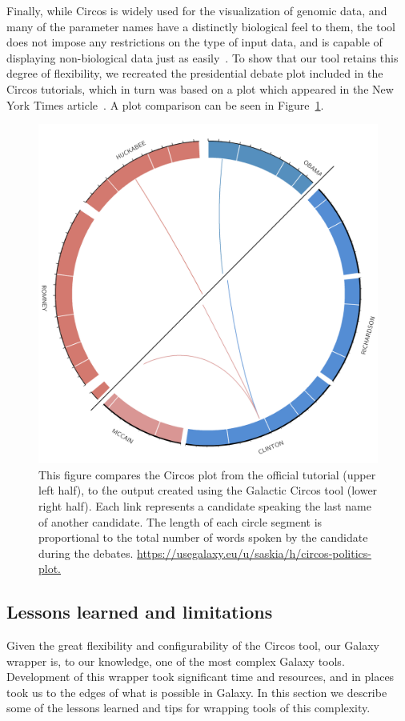 Finally, while Circos is widely used for the visualization of genomic data, and many of the parameter names have a distinctly biological feel to them, the tool does not impose any restrictions on the type of input data, and is capable of displaying non-biological data just as easily~\cite{circosnongenomic}. To show that our tool retains this degree of flexibility, we recreated the presidential debate plot included in the Circos tutorials, which in turn was based on a plot which appeared in the New York Times article~\cite{namingnames}. A plot comparison can be seen in Figure~\ref{figure:debate}.

\begin{figure}[h!]
\centering
\includegraphics[width=0.6\linewidth]{chapters/images/circos/plot-politics-both.png}
\caption{This figure compares the Circos plot from the official tutorial (upper left half), to ťhe output created using the Galactic Circos tool (lower right half). Each link represents a candidate speaking the last name of another candidate. The length of each circle segment is proportional to the total number of words spoken by the candidate during the debates. \url{ https://usegalaxy.eu/u/saskia/h/circos-politics-plot.}}
\label{figure:debate}
\end{figure}


\subsection*{Lessons learned and limitations}

Given the great flexibility and configurability of the Circos tool, our Galaxy wrapper is, to our knowledge, one of the most complex Galaxy tools. Development of this wrapper took significant time and resources, and in places took us to the edges of what is possible in Galaxy. In this section we describe some of the lessons learned and tips for wrapping tools of this complexity.

